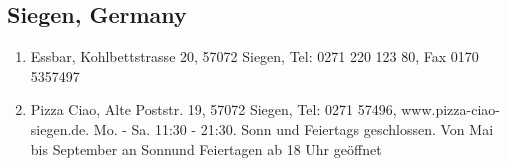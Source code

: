 \subsection{Siegen, Germany}
\begin{enumerate}
	\item Essbar, Kohlbettstrasse 20, 57072 Siegen, Tel: 0271 220 123 80, Fax 0170 5357497
	\item Pizza Ciao, Alte Poststr. 19, 57072 Siegen, Tel: 0271 57496, www.pizza-ciao-siegen.de. Mo. - Sa. 11:30 - 21:30. Sonn und Feiertags geschlossen. Von Mai bis September an Sonnund Feiertagen ab 18 Uhr geöffnet
\end{enumerate}